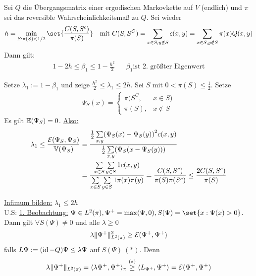 \begin{satz}
	\label{satz:Cheeger}
	Sei $Q$ die Übergangsmatrix einer ergodischen Markovkette auf $V$ (endlich) und $\pi$ sei das reversible Wahrscheinlichkeitsmaß zu $Q$. Sei wieder 
	\begin{align}
		h = \min\limits_{S:\pi(S)<1/2} \set{\frac{C(S,S^c)}{\pi(S)}} && \text{mit } C(S,S^C) = \sum\limits_{x \in S, y \notin S} c(x,y) = \sum\limits_{x \in S, y \notin S} \pi(x) Q(x,y)
	\end{align}
	Dann gilt:
	\begin{align}
		1-2h \leq \beta_1 \leq 1-\frac{h^2}{2} && \beta_1 \text{ist 2. größter Eigenwert}
	\end{align}
\end{satz}
\begin{beweis}
	Setze $\lambda_1 := 1 - \beta_1$ und zeige $\frac{h^2}{2} \leq \lambda_1 \leq 2h$. Sei $S$ mit $0 < \pi(S) \leq \frac{1}{2}$. Setze
	\begin{align}
		\Psi_S(x) = \begin{cases}
						\pi(S^C, & x\in S) \\
						\pi(S), & x \notin S
					\end{cases}
	\end{align}
	Es gilt $\EW{\Psi_S} = 0$. \underline{Also:}
	\begin{align}
		\lambda_1 \leq \frac{\mathcal{E}(\Psi_S,\Psi_S)}{\Var{\Psi_S}} &= \frac{\frac{1}{2}\sum\limits_{x,y}\enb{\Psi_S(x) - \Psi_S(y)}^2 c(x,y)}{\frac{1}{2} \sum\limits_{x,y} \enb{\Psi_S(x - \Psi_S(y))}} \\
							&= \frac{\sum\limits_{x\in S} \sum\limits_{y \in S} 1 c(x,y) }{\sum\limits_{x \in S}\sum\limits_{y \in S} 1 \pi(x) \pi(y) } = \frac{C(S,S^c)}{\pi(S) \pi(S^c)} \leq \frac{2C(S,S^c)}{\pi(S)}
	\end{align}

	\underline{Infimum bilden:} $\lambda_1 \leq 2h$ \\
	U.S: \underline{1. Beobachtung:} $\Psi \in L^2(\pi), \Psi^+ = \max(\Psi,0),	S(\Psi) = \set{ x : \Psi (x) > 0 }$. Dann gilt $\forall S(\Psi) \neq 0$ und alle $\lambda \geq 0$
	\begin{align}
		\lambda \lVert\Psi^+\rVert^2_{L^2(\pi)} \geq \mathcal{E} (\Psi^+,\Psi^+)
	\end{align}
	falls $L\Psi := (\operatorname{id} - Q) \Psi \leq \lambda\Psi$ auf $S(\Psi) \ (*)$. Denn
	\begin{align}
		\lambda \lVert\Psi^+\rVert_{L^2(\pi)} = \langle\lambda\Psi^+, \Psi^+\rangle_{\pi} \overset{(*)}{\geq} \langle L_{\Psi^+}, \Psi^+\rangle = \mathcal{E} (\Psi^+,\Psi^+)
	\end{align}


\end{beweis}

